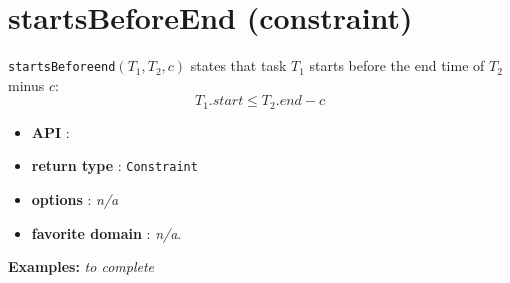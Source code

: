 \section{startsBeforeEnd (constraint)}\label{startsbeforeend:startsbeforeendconstraint}\hypertarget{startsbeforeend:startsbeforeendconstraint}{}
\begin{notedef}
\texttt{startsBeforeend}$(T_1,T_2,c)$  states that task $T_1$ starts before the end time of $T_2$ minus $c$:
  $$T_{1}.start \le T_{2}.end - c$$
\end{notedef}

\begin{itemize}
	\item \textbf{API} :
	\item \textbf{return type} : \texttt{Constraint}
	\item \textbf{options} : \emph{n/a}
	\item \textbf{favorite domain} : \emph{n/a}.
\end{itemize}

\textbf{Examples:}
%
\emph{to complete}
